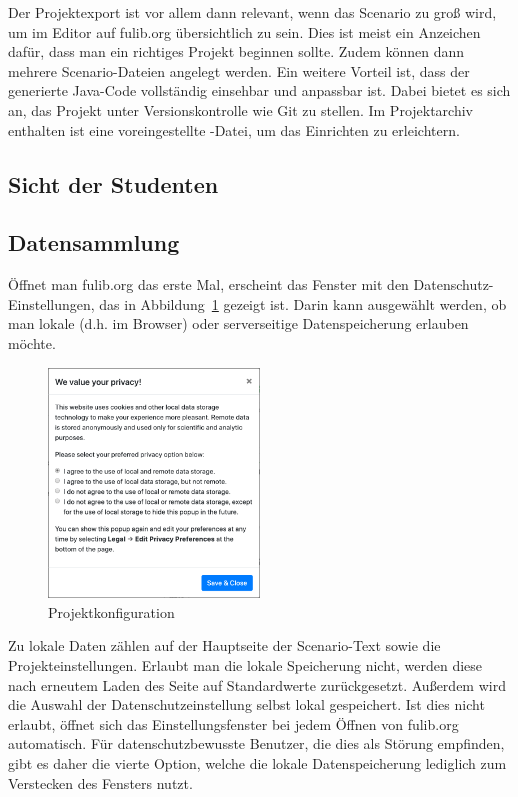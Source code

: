 Der Projektexport ist vor allem dann relevant, wenn das Scenario zu groß wird, um im Editor auf fulib.org übersichtlich zu sein.
Dies ist meist ein Anzeichen dafür, dass man ein richtiges Projekt beginnen sollte.
Zudem können dann mehrere Scenario-Dateien angelegt werden.
Ein weitere Vorteil ist, dass der generierte Java-Code vollständig einsehbar und anpassbar ist.
Dabei bietet es sich an, das Projekt unter Versionskontrolle wie Git zu stellen.
Im Projektarchiv enthalten ist eine voreingestellte -Datei, um das Einrichten zu erleichtern.

\subsection{Sicht der Studenten}\label{subsec:students-view}


\subsection{Datensammlung}\label{subsec:data-collection}

Öffnet man fulib.org das erste Mal, erscheint das Fenster mit den Datenschutz-Einstellungen, das in Abbildung~\ref{fig:privacy} gezeigt ist.
Darin kann ausgewählt werden, ob man lokale (d.h. im Browser) oder serverseitige Datenspeicherung erlauben möchte.

\begin{figure}
    \centering
    \includegraphics[width=0.5\textwidth]{chapter/fulib.org/img/privacy.png}
    \caption{Projektkonfiguration}
    \label{fig:privacy}
\end{figure}

Zu lokale Daten zählen auf der Hauptseite der Scenario-Text sowie die Projekteinstellungen.
Erlaubt man die lokale Speicherung nicht, werden diese nach erneutem Laden des Seite auf Standardwerte zurückgesetzt.
Außerdem wird die Auswahl der Datenschutzeinstellung selbst lokal gespeichert.
Ist dies nicht erlaubt, öffnet sich das Einstellungsfenster bei jedem Öffnen von fulib.org automatisch.
Für datenschutzbewusste Benutzer, die dies als Störung empfinden, gibt es daher die vierte Option,
welche die lokale Datenspeicherung lediglich zum Verstecken des Fensters nutzt.

